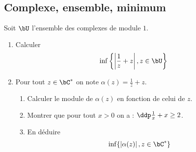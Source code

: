 
\subsection{Complexe, ensemble, minimum}


\begin{exercice}
Soit $\bU$ l'ensemble des complexes de module $1$. 
\begin{enumerate}
\item Calculer 
$$\inf \left\{ \left| \frac{1}{z}+z\right| , z \in \bU\right\}$$

\item Pour tout $z\in \bC^*$ on note  $\alpha(z)= \frac{1}{\bar{z}}+z$. 
\begin{enumerate}
\item Calculer le module de $\alpha(z)$ en fonction de celui de $z$. 
\item Montrer que pour tout $x>0$ on a : $\ddp \frac{1}{x}+x\geq 2$.
\item En déduire 
$$\inf\{ \left| \alpha(z)\right| , z \in \bC^*\}$$
\end{enumerate}
\end{enumerate}
\end{exercice}


